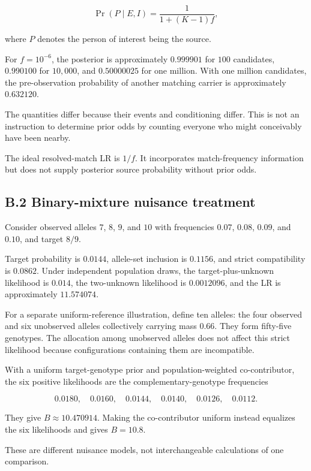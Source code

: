 \documentclass[
]{article}
\begin{document}
\[
\Pr(P\mid E,I)=\frac{1}{1+(K-1)f},
\]

where \(P\) denotes the person of interest being the source.

For \(f=10^{-6}\), the posterior is approximately \(0.999901\) for
\(100\) candidates, \(0.990100\) for \(10{,}000\), and \(0.50000025\)
for one million. With one million candidates, the pre-observation
probability of another matching carrier is approximately \(0.632120\).

The quantities differ because their events and conditioning differ. This
is not an instruction to determine prior odds by counting everyone who
might conceivably have been nearby.

The ideal resolved-match LR is \(1/f\). It incorporates match-frequency
information but does not supply posterior source probability without
prior odds.

\subsection{B.2 Binary-mixture nuisance
treatment}\label{b.2-binary-mixture-nuisance-treatment}

Consider observed alleles \(7\), \(8\), \(9\), and \(10\) with
frequencies \(0.07\), \(0.08\), \(0.09\), and \(0.10\), and target
\(8/9\).

Target probability is \(0.0144\), allele-set inclusion is \(0.1156\),
and strict compatibility is \(0.0862\). Under independent population
draws, the target-plus-unknown likelihood is \(0.014\), the two-unknown
likelihood is \(0.0012096\), and the LR is approximately \(11.574074\).

For a separate uniform-reference illustration, define ten alleles: the
four observed and six unobserved alleles collectively carrying mass
\(0.66\). They form fifty-five genotypes. The allocation among
unobserved alleles does not affect this strict likelihood because
configurations containing them are incompatible.

With a uniform target-genotype prior and population-weighted
co-contributor, the six positive likelihoods are the
complementary-genotype frequencies

\[
0.0180,\quad0.0160,\quad0.0144,\quad0.0140,\quad0.0126,\quad0.0112.
\]

They give \(B\approx10.470914\). Making the co-contributor uniform
instead equalizes the six likelihoods and gives \(B=10.8\).

These are different nuisance models, not interchangeable calculations of
one comparison.
\end{document}
